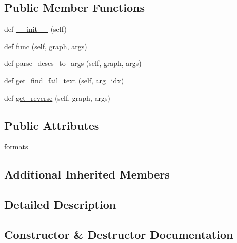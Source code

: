 \subsection*{Public Member Functions}
\begin{DoxyCompactItemize}
\item 
def \hyperlink{classlight__chats_1_1graph_1_1StealObjectFunction_a388f35f7fac6a0b0814254867c0509c4}{\+\_\+\+\_\+init\+\_\+\+\_\+} (self)
\item 
def \hyperlink{classlight__chats_1_1graph_1_1StealObjectFunction_a229fafa57d40e38da54a4b04947e2fe0}{func} (self, graph, args)
\item 
def \hyperlink{classlight__chats_1_1graph_1_1StealObjectFunction_a96475b7b415e03eb52d9efee518e755f}{parse\+\_\+descs\+\_\+to\+\_\+args} (self, graph, args)
\item 
def \hyperlink{classlight__chats_1_1graph_1_1StealObjectFunction_a1ffe38f920399831ab1fba3cd324c106}{get\+\_\+find\+\_\+fail\+\_\+text} (self, arg\+\_\+idx)
\item 
def \hyperlink{classlight__chats_1_1graph_1_1StealObjectFunction_a2e77998e7383d823d66f0adc22226ba0}{get\+\_\+reverse} (self, graph, args)
\end{DoxyCompactItemize}
\subsection*{Public Attributes}
\begin{DoxyCompactItemize}
\item 
\hyperlink{classlight__chats_1_1graph_1_1StealObjectFunction_a07d054e11c32eecd7c93102de254ffec}{formats}
\end{DoxyCompactItemize}
\subsection*{Additional Inherited Members}


\subsection{Detailed Description}
\begin{DoxyVerb}
\end{DoxyVerb}
 

\subsection{Constructor \& Destructor Documentation}
\mbox{\label{classlight__chats_1_1graph_1_1StealObjectFunction_a388f35f7fac6a0b0814254867c0509c4}} 
